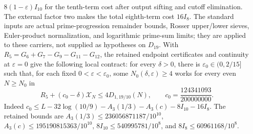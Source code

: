 $8(1-\varepsilon)I_{10}$ for the tenth-term cost after output sifting
and cutoff elimination.
The external factor two makes the total eighth-term cost $16I_8$.
The standard inputs are actual prime-progression remainder bounds,
Rosser upper/lower sieves, Euler-product normalization, and logarithmic
prime-sum limits; they are applied to these carriers, not supplied as
hypotheses on $D_{19}$.
With $R_5=G_6+G_7-G_9-G_{11}-G_{12}$, the retained endpoint
certificates and continuity at $\varepsilon=0$ give the following local
contract: for every $\delta>0$, there is
$\varepsilon_0\in(0,2/15]$ such that, for each fixed
$0<\varepsilon<\varepsilon_0$, some $N_0(\delta,\varepsilon)\ge4$
works for every even $N\ge N_0$ in
\[
 R_5+(c_0-\delta)\mathcal X_N\le4D_{1,19/10}(N),\qquad c_0=\frac{124341093}{200000000}.
\]
Indeed $c_0\le L-32\log(10/9)-A_3(1/3)-A_3(c)-8I_{10}-16I_8$.
The retained bounds are $A_3(1/3)\le236056871187/10^{10}$,
$A_3(c)\le195190815363/10^{10}$,
$8I_{10}\le540995781/10^8$, and $8I_8\le60961168/10^8$.

